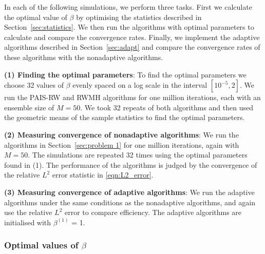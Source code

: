\documentclass[final]{siamltex}
\begin{document}
In each of the following simulations, we perform three tasks. First we calculate the optimal value of $\beta$ by optimising the statistics described in Section~\ref{sec:statistics}. We then run the algorithms with optimal parameters to calculate and compare the convergence rates. Finally, we implement the adaptive algorithms described in Section~\ref{sec:adapt} and compare the convergence rates of these algorithms with the nonadaptive algorithms.

{\bf (1) Finding the optimal parameters}: To find the optimal
parameters we choose 32 values of $\beta$ evenly spaced on a log scale
in the interval $[10^{-5}, 2]$. We run the PAIS-RW and RWMH algorithms
for one million iterations, each with an ensemble size of $M=50$. We took
32 repeats of both algorithms and then used the geometric means of the
sample statistics to find the optimal parameters.

{\bf (2) Measuring convergence of nonadaptive algorithms}: We run the algorithms in Section~\ref{sec:problem 1} for one million iterations, again with $M=50$. The simulations are repeated 32 times using the optimal parameters found in (1). The performance of the algorithms is judged by the convergence of the relative $L^2$ error statistic in \eqref{eqn:L2_error}.

{\bf (3) Measuring convergence of adaptive algorithms}: We run the
adaptive algorithms under the same conditions as the nonadaptive
algorithms, and again use the relative $L^2$ error to compare
efficiency. The adaptive algorithms are initialised with $\beta^{(1)}$ = 1.


\subsubsection{Optimal values of $\beta$}\label{sec:Optimal values P1}
\end{document}
